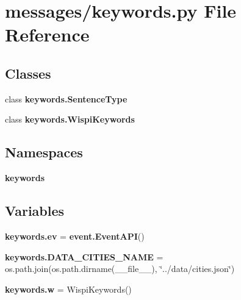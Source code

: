\section{messages/keywords.py File Reference}
\label{keywords_8py}
\subsection*{Classes}
\begin{DoxyCompactItemize}
\item 
class {\bf keywords.\+Sentence\+Type}
\item 
class {\bf keywords.\+Wispi\+Keywords}
\end{DoxyCompactItemize}
\subsection*{Namespaces}
\begin{DoxyCompactItemize}
\item 
 {\bf keywords}
\end{DoxyCompactItemize}
\subsection*{Variables}
\begin{DoxyCompactItemize}
\item 
{\bf keywords.\+ev} = {\bf event.\+Event\+A\+PI}()
\item 
{\bf keywords.\+D\+A\+T\+A\+\_\+\+C\+I\+T\+I\+E\+S\+\_\+\+N\+A\+ME} = os.\+path.\+join(os.\+path.\+dirname(\+\_\+\+\_\+file\+\_\+\+\_\+), \char`\"{}../data/cities.\+json\char`\"{})
\item 
{\bf keywords.\+w} = Wispi\+Keywords()
\end{DoxyCompactItemize}
